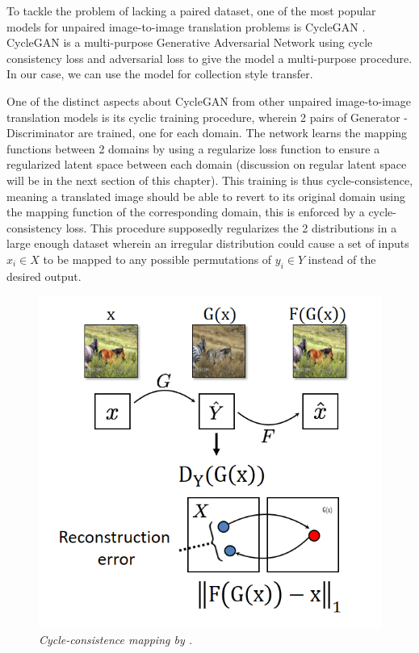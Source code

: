 \documentclass[12pt]{report}
\begin{document}
To tackle the problem of lacking a paired dataset, one of the most popular models for unpaired image-to-image translation problems is CycleGAN \cite{cycle-gan}. CycleGAN is a multi-purpose Generative Adversarial Network using cycle consistency loss and adversarial loss to give the model a multi-purpose procedure. In our case, we can use the model for collection style transfer.

One of the distinct aspects about CycleGAN\cite{cycle-gan} from other unpaired image-to-image translation models is its cyclic training procedure, wherein 2 pairs of Generator - Discriminator are trained, one for each domain. The network learns the mapping functions between 2 domains by using a regularize loss function to ensure a regularized latent space between each domain (discussion on regular latent space will be in the next section of this chapter). This training is thus cycle-consistence, meaning a translated image should be able to revert to its original domain using the mapping function of the corresponding domain, this is enforced by a cycle-consistency loss. This procedure supposedly regularizes the 2 distributions in a large enough dataset wherein an irregular distribution could cause a set of inputs $x_i$$\in$$X$ to be mapped to any possible permutations of $y_i$$\in$$Y$ instead of the desired output.

\begin{figure}[H]
	\centering
	\includegraphics[scale=0.8]{cycle-consistence}
	\caption{\textit{Cycle-consistence mapping by \cite{cycle-gan}.}}
	\label{fig:cycle-consistence}
\end{figure}
\end{document}
